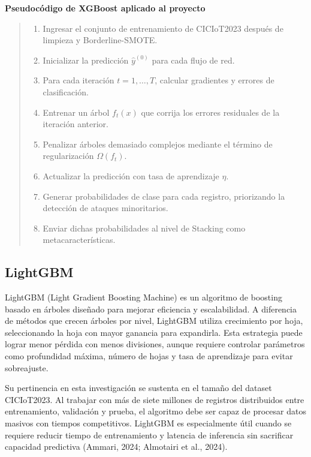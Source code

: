 \documentclass[12pt,a4paper]{article}
\begin{document}
\noindent\textbf{Pseudocódigo de XGBoost aplicado al proyecto}

\begin{quote}
\small
\begin{enumerate}
    \item Ingresar el conjunto de entrenamiento de CICIoT2023 después de limpieza y Borderline-SMOTE.
    \item Inicializar la predicción $\hat{y}^{(0)}$ para cada flujo de red.
    \item Para cada iteración $t=1,\ldots,T$, calcular gradientes y errores de clasificación.
    \item Entrenar un árbol $f_t(x)$ que corrija los errores residuales de la iteración anterior.
    \item Penalizar árboles demasiado complejos mediante el término de regularización $\Omega(f_t)$.
    \item Actualizar la predicción con tasa de aprendizaje $\eta$.
    \item Generar probabilidades de clase para cada registro, priorizando la detección de ataques minoritarios.
    \item Enviar dichas probabilidades al nivel de Stacking como metacaracterísticas.
\end{enumerate}
\end{quote}

\subsection{LightGBM}

LightGBM (Light Gradient Boosting Machine) es un algoritmo de boosting basado en árboles diseñado para mejorar eficiencia y escalabilidad. A diferencia de métodos que crecen árboles por nivel, LightGBM utiliza crecimiento por hoja, seleccionando la hoja con mayor ganancia para expandirla. Esta estrategia puede lograr menor pérdida con menos divisiones, aunque requiere controlar parámetros como profundidad máxima, número de hojas y tasa de aprendizaje para evitar sobreajuste.

Su pertinencia en esta investigación se sustenta en el tamaño del dataset CICIoT2023. Al trabajar con más de siete millones de registros distribuidos entre entrenamiento, validación y prueba, el algoritmo debe ser capaz de procesar datos masivos con tiempos competitivos. LightGBM es especialmente útil cuando se requiere reducir tiempo de entrenamiento y latencia de inferencia sin sacrificar capacidad predictiva (Ammari, 2024; Almotairi et al., 2024).
\end{document}
